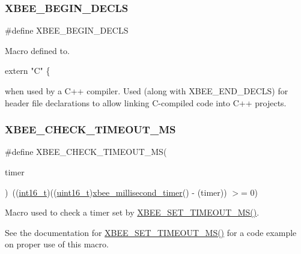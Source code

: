 \subsubsection{\texorpdfstring{X\+B\+E\+E\+\_\+\+B\+E\+G\+I\+N\+\_\+\+D\+E\+C\+LS}{XBEE\_BEGIN\_DECLS}}
{\footnotesize\ttfamily \#define X\+B\+E\+E\+\_\+\+B\+E\+G\+I\+N\+\_\+\+D\+E\+C\+LS}



Macro defined to. 


\begin{DoxyCode}
\textcolor{keyword}{extern} \textcolor{stringliteral}{"C"} \{ 
\end{DoxyCode}
 when used by a C++ compiler. Used (along with X\+B\+E\+E\+\_\+\+E\+N\+D\+\_\+\+D\+E\+C\+LS) for header file declarations to allow linking C-\/compiled code into C++ projects. \mbox{\label{group__hal_gac3485c3c34a50a5a35d553cc743d163e}} 
\subsubsection{\texorpdfstring{X\+B\+E\+E\+\_\+\+C\+H\+E\+C\+K\+\_\+\+T\+I\+M\+E\+O\+U\+T\+\_\+\+MS}{XBEE\_CHECK\_TIMEOUT\_MS}}
{\footnotesize\ttfamily \#define X\+B\+E\+E\+\_\+\+C\+H\+E\+C\+K\+\_\+\+T\+I\+M\+E\+O\+U\+T\+\_\+\+MS(\begin{DoxyParamCaption}\item[{}]{timer }\end{DoxyParamCaption})~((\hyperlink{group__hal__dos_ga2140805d08462d474b82ddc8d1c2f3e6}{int16\+\_\+t})((\hyperlink{group__hal__dos_ga5a8b2dc9e45a9ee81a94ef304fb62505}{uint16\+\_\+t})\hyperlink{group__hal_ga22b4e3df788254ca5f8530e9aee58515}{xbee\+\_\+millisecond\+\_\+timer}() -\/ (timer)) $>$= 0)}



Macro used to check a timer set by \hyperlink{group__hal_ga848a9903fa7859d84cb22aeddde4c42f}{X\+B\+E\+E\+\_\+\+S\+E\+T\+\_\+\+T\+I\+M\+E\+O\+U\+T\+\_\+\+M\+S()}. 

See the documentation for \hyperlink{group__hal_ga848a9903fa7859d84cb22aeddde4c42f}{X\+B\+E\+E\+\_\+\+S\+E\+T\+\_\+\+T\+I\+M\+E\+O\+U\+T\+\_\+\+M\+S()} for a code example on proper use of this macro.


